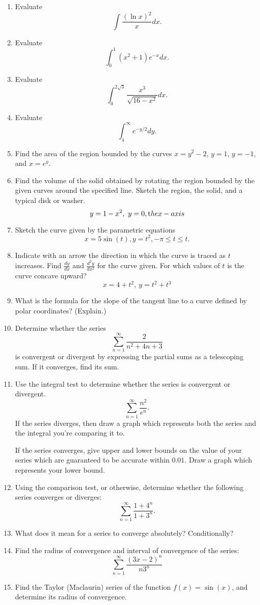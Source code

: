 \documentclass[12pt]{article}
\begin{document}
\begin{enumerate}[(1)]
\item
Evaluate
\[
\int \frac{(\ln x)^2}{x} dx.
\]
\item
Evaluate
\[
\int_0^1 (x^2 + 1)e^{-x} dx.
\]
\item
Evaluate
\[
\int_0^{2 \sqrt{3}} \frac{x^3}{\sqrt{16 - x^2}} dx.
\]
\item
Evaluate
\[
\int_4^{\infty} e^{-y/2} dy.
\]
\item
Find the area of the region bounded by the curves $x= y^2 - 2$, $y = 1$, $y = -1$, and
$x = e^y$.
\item
Find the volume of the solid obtained by rotating the region bounded by the given curves
around the specified line. Sketch the region, the solid, and a typical disk or washer.
\[
y = 1 - x^2, \ y = 0, {\textnormal the x-axis}
\]
\item
Sketch the curve given by the parametric equations
\[
x = 5 \sin(t), y = t^2, - \pi \leq t \leq t.
\]
\item
Indicate with an arrow the direction in which the curve is traced as $t$ increases.
Find $\frac{dy}{dx}$ and $\frac{d^2 y}{dx^2}$ for the curve given. For which values of $t$ is
the curve concave upward?
\[
x = 4 + t^2, \ y = t^2 + t^3
\]
\item
What is the formula for the slope of the tangent line to a curve defined by polar coordinates? (Explain.)
\item
Determine whether the series
\[
\sum_{n = 1}^{\infty} \frac{2}{n^2 + 4n + 3}
\]
is convergent or divergent 
by expressing the partial sums as a telescoping sum. If it converges, find its sum.
\item
Use the integral test to determine whether the series is convergent or divergent.
\[
\sum_{n = 1}^{\infty} \frac{n^2}{e^n}.
\]
If the series diverges, then draw a graph which
represents both the series and the integral you’re comparing it to.

If the series converges, give upper and lower bounds on the value of your series
which are guaranteed to be accurate within $0.01$. Draw a graph which represents your
lower bound.
\item
Using the comparison test, or otherwise, determine whether the following series converges or diverges:
\[
\sum_{n = 1}^{\infty} \frac{1 + 4^n}{1 + 3^n}.
\]
\item
What does it mean for a series to converge absolutely? Conditionally?
\item
Find the radius of convergence and interval of convergence of the series:
\[
\sum_{n = 1}^{\infty} \frac{ (3x - 2)^n }{n 3^n}
\]
\item
Find the Taylor (Maclaurin) series of the function $f(x) = \sin(x)$, and determine its
radius of convergence.

\end{enumerate}
\end{document}
